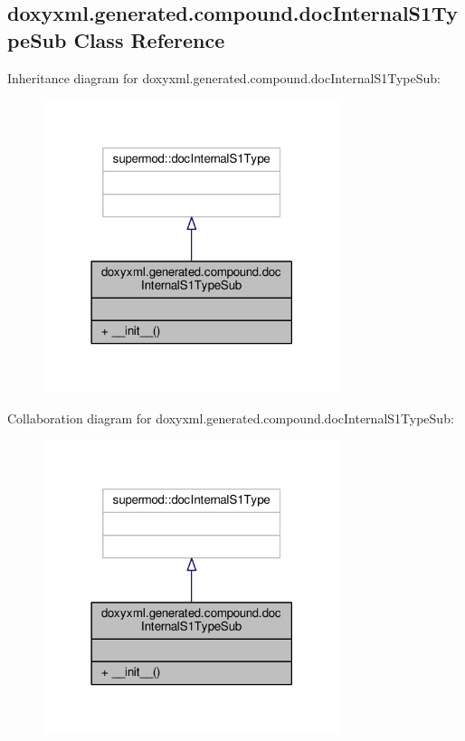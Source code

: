 \subsection{doxyxml.\+generated.\+compound.\+doc\+Internal\+S1\+Type\+Sub Class Reference}
\label{classdoxyxml_1_1generated_1_1compound_1_1docInternalS1TypeSub}


Inheritance diagram for doxyxml.\+generated.\+compound.\+doc\+Internal\+S1\+Type\+Sub\+:
\nopagebreak
\begin{figure}[H]
\begin{center}
\leavevmode
\includegraphics[width=246pt]{d3/d9d/classdoxyxml_1_1generated_1_1compound_1_1docInternalS1TypeSub__inherit__graph}
\end{center}
\end{figure}


Collaboration diagram for doxyxml.\+generated.\+compound.\+doc\+Internal\+S1\+Type\+Sub\+:
\nopagebreak
\begin{figure}[H]
\begin{center}
\leavevmode
\includegraphics[width=246pt]{db/d5e/classdoxyxml_1_1generated_1_1compound_1_1docInternalS1TypeSub__coll__graph}
\end{center}
\end{figure}
